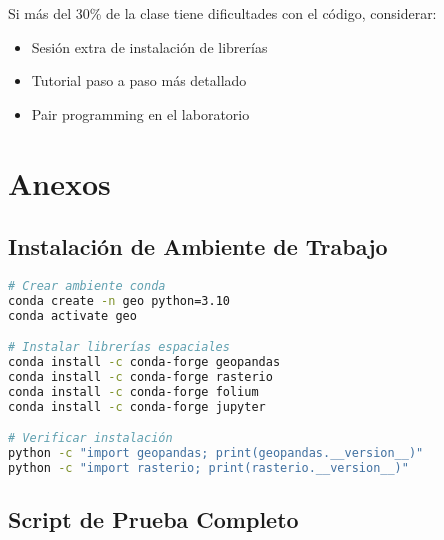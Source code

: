 \documentclass[11pt,a4paper]{article}
\newcommand{\alerta}[1]{\begin{tcolorbox}[colback=red!5,colframe=red,title={ALERTA}]#1\end{tcolorbox}}
\begin{document}
\alerta{
Si más del 30\% de la clase tiene dificultades con el código, considerar:
\begin{itemize}
    \item Sesión extra de instalación de librerías
    \item Tutorial paso a paso más detallado
    \item Pair programming en el laboratorio
\end{itemize}
}

\newpage

\section{Anexos}

\subsection{Instalación de Ambiente de Trabajo}

\begin{lstlisting}[language=bash]
# Crear ambiente conda
conda create -n geo python=3.10
conda activate geo

# Instalar librerías espaciales
conda install -c conda-forge geopandas
conda install -c conda-forge rasterio
conda install -c conda-forge folium
conda install -c conda-forge jupyter

# Verificar instalación
python -c "import geopandas; print(geopandas.__version__)"
python -c "import rasterio; print(rasterio.__version__)"
\end{lstlisting}

\subsection{Script de Prueba Completo}
\end{document}
